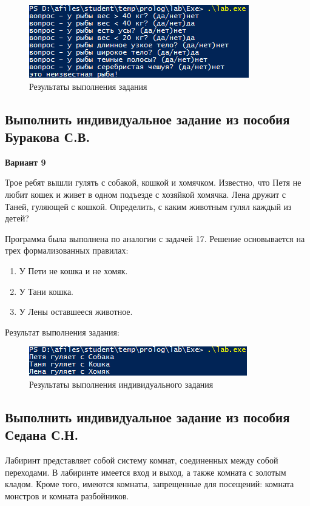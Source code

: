 \documentclass[14pt,a4paper,report]{report}
\begin{document}
\begin{figure}[h!]
	\centering
	\includegraphics[scale = 1.0]{images/d21_3.png}
	\caption{Результаты выполнения задания}
\end{figure}

\subsection{Выполнить индивидуальное задание из пособия Буракова С.В.}

\textbf{Вариант 9}

Трое ребят вышли гулять с собакой, кошкой и хомячком. Известно, что Петя не любит кошек и живет в одном подъезде с хозяйкой хомячка. Лена дружит с Таней, гуляющей с кошкой. Определить, с каким животным гулял каждый из детей?



Программа была выполнена по аналогии с задачей 17. Решение основывается на трех формализованных правилах:

\begin{enumerate}
	\item У Пети не кошка и не хомяк.
	\item У Тани кошка.
	\item У Лены оставшееся животное.
\end{enumerate}

Результат выполнения задания:

\begin{figure}[h!]
	\centering
	\includegraphics[scale = 1.0]{images/i1.png}
	\caption{Результаты выполнения индивидуального задания}
\end{figure}


\subsection{Выполнить индивидуальное задание из пособия Седана С.Н.}

Лабиринт представляет собой систему комнат, соединенных между собой переходами. В лабиринте имеется вход и выход, а также комната с золотым кладом. Кроме того, имеются комнаты, запрещенные для посещений: комната монстров и комната разбойников.
\end{document}
